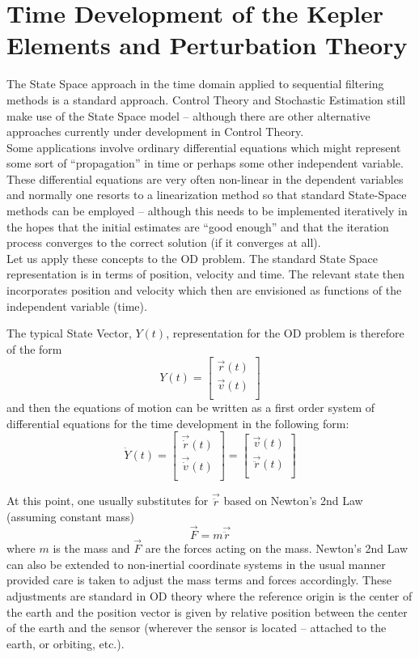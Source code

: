 \section{Time Development of the Kepler Elements and Perturbation Theory}

The State Space approach in the time domain applied to sequential filtering methods is a standard approach. Control Theory and Stochastic Estimation still make use of the State Space model -- although there are other alternative approaches currently under development in Control Theory. \\

Some applications involve ordinary differential equations which might represent some sort of ``propagation'' in time or perhaps some other independent variable. These differential equations are very often non-linear in the dependent variables and normally one resorts to a linearization method so that standard State-Space methods can be employed -- although this needs to be implemented iteratively in the hopes that the initial estimates are ``good enough'' and that the 
iteration process converges to the correct solution (if it converges at all).\\

Let us apply these concepts to the OD problem. The standard State Space representation is in terms of position, velocity and time. The relevant state then incorporates position and velocity which then are envisioned as functions of the independent variable (time). 

The typical State Vector, $Y(t)$, representation for the OD problem is therefore of the form 
$$Y(t) = 
\begin{bmatrix}
\vec{r}(t)\\
\vec{v}(t)\\
\end{bmatrix}$$and then the equations of motion can be written as a first order system of differential equations for the time development in the following form:
$$\dot Y(t) = 
\begin{bmatrix}
\vec{\dot r}(t)\\
\vec{\dot v}(t)\\
\end{bmatrix} =
\begin{bmatrix}
\vec{v}(t)\\
\vec{\ddot r}(t)\\
\end{bmatrix}
$$

At this point, one usually substitutes for $\vec{\ddot r}$ based on Newton's 2nd Law (assuming constant mass) $$\vec{F} = m\vec{\ddot r}$$where $m$ is the mass and $\vec{F}$ are the forces acting on the mass. Newton's 2nd Law can also be extended to non-inertial coordinate systems in the usual manner provided care is taken to adjust the mass terms and forces accordingly. These adjustments are standard in OD theory where the reference origin is the center of the earth
and the position vector is given by relative position between the center of the earth and the sensor (wherever the sensor is located -- attached to the earth, or orbiting, etc.).\\

